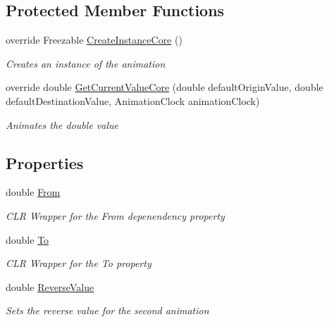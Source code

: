 \subsection*{Protected Member Functions}
\begin{DoxyCompactItemize}
\item 
override Freezable \mbox{\hyperlink{class_wpf_handler_1_1_u_i_1_1_animations_1_1_grid_length_animation_1_1_expander_double_animation_a5645ce2b57d614b780066d0488b6dbd2}{Create\+Instance\+Core}} ()
\begin{DoxyCompactList}\small\item\em Creates an instance of the animation \end{DoxyCompactList}\item 
override double \mbox{\hyperlink{class_wpf_handler_1_1_u_i_1_1_animations_1_1_grid_length_animation_1_1_expander_double_animation_a49199d29a79cc39beb113376997e5973}{Get\+Current\+Value\+Core}} (double default\+Origin\+Value, double default\+Destination\+Value, Animation\+Clock animation\+Clock)
\begin{DoxyCompactList}\small\item\em Animates the double value \end{DoxyCompactList}\end{DoxyCompactItemize}
\subsection*{Properties}
\begin{DoxyCompactItemize}
\item 
double \mbox{\hyperlink{class_wpf_handler_1_1_u_i_1_1_animations_1_1_grid_length_animation_1_1_expander_double_animation_a2273bd2ccab6914f1b20bacf5c213ec7}{From}}
\begin{DoxyCompactList}\small\item\em C\+LR Wrapper for the From depenendency property \end{DoxyCompactList}\item 
double \mbox{\hyperlink{class_wpf_handler_1_1_u_i_1_1_animations_1_1_grid_length_animation_1_1_expander_double_animation_aecdf2e18236eeb5bafc523b556c80641}{To}}
\begin{DoxyCompactList}\small\item\em C\+LR Wrapper for the To property \end{DoxyCompactList}\item 
double \mbox{\hyperlink{class_wpf_handler_1_1_u_i_1_1_animations_1_1_grid_length_animation_1_1_expander_double_animation_afe3c498fad9f7f6be927b5d1d1f7514b}{Reverse\+Value}}
\begin{DoxyCompactList}\small\item\em Sets the reverse value for the second animation \end{DoxyCompactList}\end{DoxyCompactItemize}


